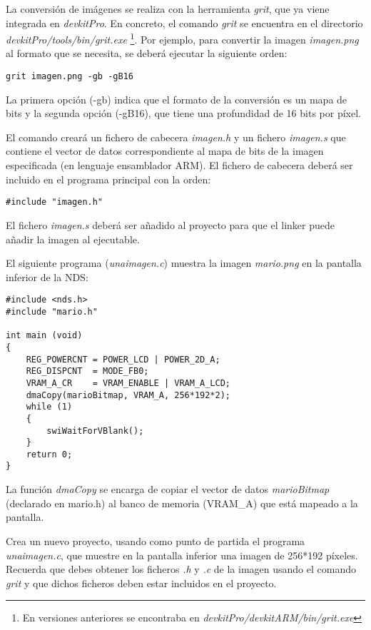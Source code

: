 La conversión de imágenes se realiza con la herramienta \textit{grit}, que ya viene integrada en \textit{devkitPro}. En concreto, el comando \textit{grit} se encuentra en el directorio \textit{devkitPro/tools/bin/grit.exe} \footnote{En versiones anteriores se encontraba en \textit{devkitPro/devkitARM/bin/grit.exe}}. Por ejemplo, para convertir la imagen \textit{imagen.png} al formato que se necesita, se deberá ejecutar la siguiente orden:

\begin{verbatim}
grit imagen.png -gb -gB16
\end{verbatim}

La primera opción (-gb) indica que el formato de la conversión es un mapa de bits y la segunda opción (-gB16), que tiene una profundidad de 16 bits por píxel.

El comando creará un fichero de cabecera \textit{imagen.h} y un fichero \textit{imagen.s} que contiene el vector de datos correspondiente al mapa de bits de la imagen especificada (en lenguaje ensamblador ARM). El fichero de cabecera deberá ser incluido en el programa principal con la orden:

\begin{verbatim}
#include "imagen.h"
\end{verbatim}
	
El fichero \textit{imagen.s} deberá ser añadido al proyecto para que el linker puede añadir la imagen al ejecutable.

\begin{example}
El siguiente programa (\textit{unaimagen.c}) muestra la imagen \textit{mario.png} en la pantalla inferior de la NDS:

\begin{lstlisting}
#include <nds.h>
#include "mario.h"

int main (void)
{
	REG_POWERCNT = POWER_LCD | POWER_2D_A;
	REG_DISPCNT  = MODE_FB0;
	VRAM_A_CR    = VRAM_ENABLE | VRAM_A_LCD;
	dmaCopy(marioBitmap, VRAM_A, 256*192*2);
	while (1)
	{
		swiWaitForVBlank();
	}
	return 0;
}
\end{lstlisting}
\end{example}

La función \textit{dmaCopy} se encarga de copiar el vector de datos \textit{marioBitmap} (declarado en mario.h) al banco de memoria (VRAM\_A) que está mapeado a la pantalla.

\begin{exercise}
Crea un nuevo proyecto, usando como punto de partida el programa \textit{unaimagen.c}, que muestre en la pantalla inferior una imagen de 256*192 píxeles. Recuerda que debes obtener los ficheros \textit{.h} y \textit{.c} de la imagen usando el comando \textit{grit} y que dichos ficheros deben estar incluidos en el proyecto.
\end{exercise}


